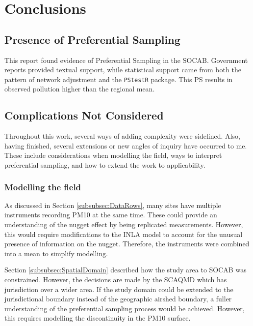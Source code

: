 %
\section{Conclusions}\label{sec:conclusions}

\subsection{Presence of Preferential Sampling}
\label{subsec:presenceprefsamp}

This report found evidence of Preferential Sampling in the \ac{SOCAB}.  Government reports provided textual support, while statistical support came from both the pattern of network adjustment and the \texttt{PStestR} package.  This \ac{PS} results in observed pollution higher than the regional mean.


\subsection{Complications Not Considered}
\label{subsec:notconsidered}
Throughout this work, several ways of adding complexity were sidelined.  Also, having finished, several extensions or new angles of inquiry have occurred to me.  These include considerations when modelling the field, ways to interpret preferential sampling, and how to extend the work to applicability.

\subsubsection*{Modelling the field}
\label{subsubsec:modellingfield}
As discussed in Section \ref{subsubsec:DataRows}, many sites have multiple instruments recording \ac{PM10} at the same time.  These could provide an understanding of the nugget effect by being replicated measurements.  However, this would require modifications to the \ac{INLA} model to account for the unusual presence of information on the nugget.  Therefore, the instruments were combined into a mean to simplify modelling.

Section \ref{subsubsec:SpatialDomain} described how the study area to \ac{SOCAB} was constrained.  However, the decisions are made by the \ac{SCAQMD} which has jurisdiction over a wider area. If the study domain could be extended to the jurisdictional boundary instead of the geographic airshed boundary, a fuller understanding of the preferential sampling process would be achieved. However, this requires modelling the discontinuity in the \ac{PM10} surface.

